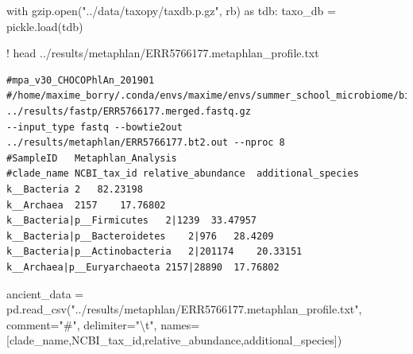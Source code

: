 \documentclass[
  letterpaper,
]{book}
\newenvironment{Shaded}{}{}
\newcommand{\BuiltInTok}[1]{\textcolor[rgb]{0.84,0.23,0.29}{#1}}
\newcommand{\CharTok}[1]{\textcolor[rgb]{0.01,0.18,0.38}{#1}}
\newcommand{\ControlFlowTok}[1]{\textcolor[rgb]{0.84,0.23,0.29}{#1}}
\newcommand{\ImportTok}[1]{\textcolor[rgb]{0.01,0.18,0.38}{#1}}
\newcommand{\NormalTok}[1]{\textcolor[rgb]{0.14,0.16,0.18}{#1}}
\newcommand{\OperatorTok}[1]{\textcolor[rgb]{0.14,0.16,0.18}{#1}}
\newcommand{\StringTok}[1]{\textcolor[rgb]{0.01,0.18,0.38}{#1}}
\begin{document}
\begin{Shaded}
\begin{Highlighting}[]
\ControlFlowTok{with}\NormalTok{ gzip.}\BuiltInTok{open}\NormalTok{(}\StringTok{"../data/taxopy/taxdb.p.gz"}\NormalTok{, }\StringTok{\textquotesingle{}rb\textquotesingle{}}\NormalTok{) }\ImportTok{as}\NormalTok{ tdb:}
\NormalTok{    taxo\_db }\OperatorTok{=}\NormalTok{ pickle.load(tdb)}
\end{Highlighting}
\end{Shaded}

\begin{Shaded}
\begin{Highlighting}[]
\OperatorTok{!}\NormalTok{ head ..}\OperatorTok{/}\NormalTok{results}\OperatorTok{/}\NormalTok{metaphlan}\OperatorTok{/}\NormalTok{ERR5766177.metaphlan\_profile.txt}
\end{Highlighting}
\end{Shaded}

\begin{verbatim}
#mpa_v30_CHOCOPhlAn_201901
#/home/maxime_borry/.conda/envs/maxime/envs/summer_school_microbiome/bin/metaphlan ../results/fastp/ERR5766177.merged.fastq.gz
--input_type fastq --bowtie2out ../results/metaphlan/ERR5766177.bt2.out --nproc 8
#SampleID   Metaphlan_Analysis
#clade_name NCBI_tax_id relative_abundance  additional_species
k__Bacteria 2   82.23198
k__Archaea  2157    17.76802
k__Bacteria|p__Firmicutes   2|1239  33.47957
k__Bacteria|p__Bacteroidetes    2|976   28.4209
k__Bacteria|p__Actinobacteria   2|201174    20.33151
k__Archaea|p__Euryarchaeota 2157|28890  17.76802
\end{verbatim}

\begin{Shaded}
\begin{Highlighting}[]
\NormalTok{ancient\_data }\OperatorTok{=}\NormalTok{ pd.read\_csv(}\StringTok{"../results/metaphlan/ERR5766177.metaphlan\_profile.txt"}\NormalTok{,}
\NormalTok{                            comment}\OperatorTok{=}\StringTok{"\#"}\NormalTok{,}
\NormalTok{                            delimiter}\OperatorTok{=}\StringTok{"}\CharTok{\textbackslash{}t}\StringTok{"}\NormalTok{,}
\NormalTok{                            names}\OperatorTok{=}\NormalTok{[}\StringTok{\textquotesingle{}clade\_name\textquotesingle{}}\NormalTok{,}\StringTok{\textquotesingle{}NCBI\_tax\_id\textquotesingle{}}\NormalTok{,}\StringTok{\textquotesingle{}relative\_abundance\textquotesingle{}}\NormalTok{,}\StringTok{\textquotesingle{}additional\_species\textquotesingle{}}\NormalTok{])}
\end{Highlighting}
\end{Shaded}
\end{document}
